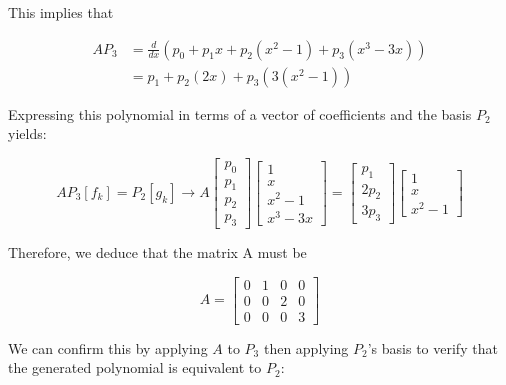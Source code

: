 \documentclass{article}
\begin{document}
		This implies that 
		
		\begin{center}
			\begin{align*}
				AP_{3}&=\frac{d}{dx}(p_{0}+p_{1}x+p_{2}(x^{2}-1)+p_{3}(x^{3}-3x)) \\
				&=p_{1}+p_{2}(2x)+p_{3}(3(x^{2}-1))
			\end{align*}
		\end{center}
		
		Expressing this polynomial in terms of a vector of coefficients and the basis $P_{2}$ yields:
		
		\begin{center}
			\begin{equation}
			AP_{3}[f_{k}] = P_{2}[g_{k}]\rightarrow A
			\begin{bmatrix} p_{0}\\p_{1}\\p_{2}\\p_{3}\end{bmatrix}
			\begin{bmatrix} 1 \\ x \\ x^{2}-1 \\ x^{3}-3x \end{bmatrix}=
			\begin{bmatrix} p_{1}\\2p_{2}\\3p_{3}\end{bmatrix}
			\begin{bmatrix} 1 \\ x \\ x^{2}-1\end{bmatrix}
			\end{equation}
		\end{center}
		
		Therefore, we deduce that the matrix A must be 
		
		\begin{center}
			\begin{equation}
				A= \begin{bmatrix}0&1&0&0\\0&0&2&0\\0&0&0&3\end{bmatrix}
			\end{equation}
		\end{center}
		
		We can confirm this by applying $A$ to $P_{3}$ then applying $P_{2}$'s basis to verify that the generated polynomial is equivalent to $P_{2}$:
		
\end{document}
